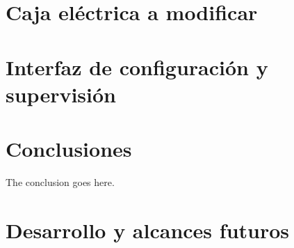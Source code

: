 \documentclass[conference]{IEEEtran}
\begin{document}
\section{Caja eléctrica a modificar}


\section{Interfaz de configuración y supervisión}


\section{Conclusiones}
The conclusion goes here.


\section{Desarrollo y alcances futuros}

\end{document}
